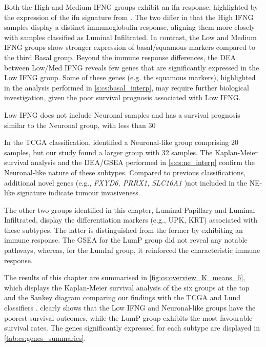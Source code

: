 Both the High and Medium IFNG groups exhibit an \acrshort{ifn} response, highlighted by the expression of the \acrshort{ifn} signature from \citet{Baker2022-bj}. The two differ in that the High IFNG samples display a distinct immunoglobulin response, aligning them more closely with samples classified as Luminal Infiltrated. In contrast, the Low and Medium IFNG groups show stronger expression of basal/squamous markers compared to the third Basal group. Beyond the immune response differences, the DEA between Low/Med IFNG reveals few genes that are significantly expressed in the Low IFNG group. Some of these genes (e.g. the squamous markers), highlighted in the analysis performed in \cref{s:cs:basal_interp}, may require further biological investigation, given the poor survival prognosis associated with Low IFNG.

Low IFNG does not include Neuronal samples and has a survival prognosis similar to the Neuronal group, with less than 30%

In the TCGA classification, \citet{Robertson2017-mg} identified a Neuronal-like group comprising 20 samples, but our study found a larger group with 32 samples. The Kaplan-Meier survival analysis and the DEA/GSEA performed in \cref{s:cs:ne_interp} confirm the Neuronal-like nature of these subtypes. Compared to previous classifications, additional novel genes (e.g., \textit{FXYD6, PRRX1, SLC16A1} )not included in the NE-like signature indicate tumour invasiveness.

The other two groups identified in this chapter, Luminal Papillary and Luminal Infiltrated, display the differentiation markers (e.g., UPK, KRT) associated with these subtypes. The latter is distinguished from the former by exhibiting an immune response. The GSEA for the LumP group did not reveal any notable pathways, whereas, for the LumInf group, it reinforced the characteristic immune response.


The results of this chapter are summarised in \cref{fig:cs:overview_K_means_6}, which displays the Kaplan-Meier survival analysis of the six groups at the top and the Sankey diagram comparing our findings with the TCGA and Lund classifiers \citep{Robertson2017-mg,Marzouka2018-ge}.  clearly shows that the Low IFNG and Neuronal-like groups have the poorest survival outcomes, while the LumP group exhibits the most favourable survival rates. The genes significantly expressed for each subtype are displayed in \cref{tab:cs:genes_summaries}.
 
